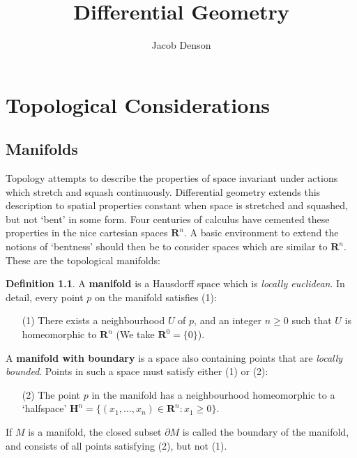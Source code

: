 \documentclass[12pt]{report}
\title{Differential Geometry}
\author{Jacob Denson}
\theoremstyle{plain}
\theoremstyle{definition}
\newtheorem*{defi}{Definition}
\newenvironment{definition}
    {\begin{samepage}\begin{framed}\begin{defi}}
    {\end{defi}\end{framed}\end{samepage}}
\begin{document}

\maketitle

\tableofcontents


\chapter{Topological Considerations}

\section{Manifolds}

Topology attempts to describe the properties of space invariant under actions which stretch and squash continuously. Differential geometry extends this description to spatial properties constant when space is stretched and squashed, but not `bent' in some form. Four centuries of calculus have cemented these properties in the nice cartesian spaces $\mathbf{R}^n$. A basic environment to extend the notions of `bentness' should then be to consider spaces which are similar to $\mathbf{R}^n$. These are the topological manifolds:

\begin{definition}
    A {\bf manifold} is a Hausdorff space which is {\it locally euclidean}. In detail, every point $p$ on the manifold satisfies (1):
    \begin{enumerate}
        \item[(1)] There exists a neighbourhood $U$ of $p$, and an integer $n \geq 0$ such that $U$ is homeomorphic to $\mathbf{R}^n$ (We take $\mathbf{R}^0 = \{0\}$).
    \end{enumerate}
    A {\bf manifold with boundary} is a space also containing points that are {\it locally bounded}. Points in such a space must satisfy either (1) or (2):
    \begin{enumerate}
        \item[(2)] The point $p$ in the manifold has a neighbourhood homeomorphic to a `halfspace' $\mathbf{H}^n = \{ (x_1, \dots, x_n) \in \mathbf{R}^n: x_1 \geq 0 \}$.
    \end{enumerate}
    If $M$ is a manifold, the closed subset $\partial M$ is called the boundary of the manifold, and consists of all points satisfying (2), but not (1).
\end{definition}
\end{document}
